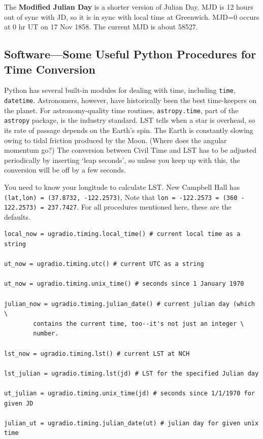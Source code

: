 \documentclass[11pt,preprint]{aastex}
\begin{document}
The {\bf Modified Julian Day} is a shorter version of Julian Day. MJD is 12
hours out of sync with JD, so it is in sync with local time at
Greenwich. MJD=0 occurs at 0 hr UT on 17 Nov 1858.  The current MJD is
about 58527. %

\subsection{ Software---Some Useful Python Procedures for Time Conversion}

Python has several built-in modules for dealing with time, including {\tt time}, {\tt datetime}.
Astronomers, however, have historically been the best time-keepers on the planet.  For
astronomy-quality time routines, {\tt astropy.time}, part of the {\tt astropy} package, is
the industry standard.
LST tells when a star
is overhead, so its rate of passage depends on the Earth's spin. The
Earth is constantly slowing owing to tidal friction produced by the
Moon. (Where does the angular momentum go?) The conversion between Civil Time and LST has to be adjusted
periodically by inserting `leap seconds', so unless you keep up with
this, the conversion will be off by a few seconds. 

You need to know your
longitude to calculate LST. New Campbell Hall has \\
{\tt (lat,lon) = (37.8732, -122.2573)},  Note that {\tt lon = -122.2573 = (360 - 122.2573) = 237.7427}. 
For all procedures mentioned here, these are the defaults.

\begin{verbatim}
local_now = ugradio.timing.local_time() # current local time as a string

ut_now = ugradio.timing.utc() # current UTC as a string

ut_now = ugradio.timing.unix_time() # seconds since 1 January 1970

julian_now = ugradio.timing.julian_date() # current julian day (which \
        contains the current time, too--it's not just an integer \
        number. 
                                                                               
lst_now = ugradio.timing.lst() # current LST at NCH
                                                                               
lst_julian = ugradio.timing.lst(jd) # LST for the specified Julian day                                                             
                                                                               
ut_julian = ugradio.timing.unix_time(jd) # seconds since 1/1/1970 for given JD
                                                                               
julian_ut = ugradio.timing.julian_date(ut) # julian day for given unix time
\end{verbatim}
\end{document}
